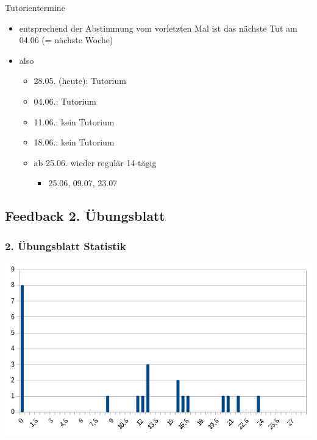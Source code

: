 \documentclass[18pt]{beamer}
\begin{document}
\begin{frame}{Tutorientermine}
	\begin{itemize}
		\item entsprechend der Abstimmung vom vorletzten Mal ist das nächste Tut am 04.06 (= nächste Woche)
		\item also
		\begin{itemize}
			\item 28.05. (heute): Tutorium
			\item 04.06.: Tutorium
			\item 11.06.: kein Tutorium
			\item 18.06.: kein Tutorium
			\item ab 25.06. wieder regulär 14-tägig
			\begin{itemize}
				\item 25.06, 09.07, 23.07
			\end{itemize}
		\end{itemize}
	\end{itemize}
\end{frame}

\subsection{Feedback 2. Übungsblatt}
\begin{frame}
	\frametitle{2. Übungsblatt Statistik}
	\includegraphics[scale=0.7]{./pics/tut2/statistics-ub2.png}
\end{frame}
	
\end{document}
